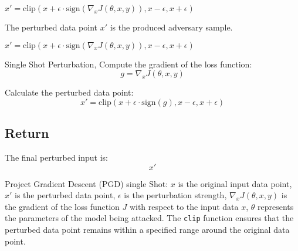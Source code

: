 $x' = \text{clip}(x + \epsilon \cdot \text{sign}(\nabla_x J(\theta, x, y)), x - \epsilon, x + \epsilon)$

The perturbed data point $x'$ is the produced adversary sample.

$x' = \text{clip}(x + \epsilon \cdot \text{sign}(\nabla_x J(\theta, x, y)), x - \epsilon, x + \epsilon)$

Single Shot Perturbation, Compute the gradient of the loss function:
\[
g = \nabla_x J(\theta, x, y)
\]

Calculate the perturbed data point:
\[
x' = \text{clip}(x + \epsilon \cdot \text{sign}(g), x - \epsilon, x + \epsilon)
\]

\subsection*{Return}
The final perturbed input is:
\[
x'
\]

Project Gradient Descent (PGD) single Shot:
$x$ is the original input data point,
$x'$ is the perturbed data point,
$\epsilon$ is the perturbation strength,
$\nabla_x J(\theta, x, y)$ is the gradient of the loss function $J$ with respect to the input data $x$,
$\theta$ represents the parameters of the model being attacked.
The \texttt{clip} function ensures that the perturbed data point remains within a specified range around the original data point.